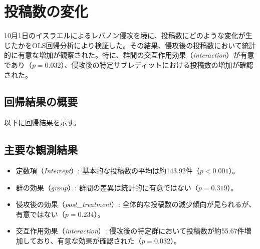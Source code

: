 \documentclass[11pt, a4j]{jreport}
\begin{document}
    \section{投稿数の変化}
    10月1日のイスラエルによるレバノン侵攻を境に、投稿数にどのような変化が生じたかをOLS回帰分析により検証した。その結果、侵攻後の投稿数において統計的に有意な増加が観察された。特に、群間の交互作用効果（\textit{interaction}）が有意であり（$p = 0.032$）、侵攻後の特定サブレディットにおける投稿数の増加が確認された。

    \subsection*{回帰結果の概要}
    以下に回帰結果を示す。

    \begin{table}[H]
        \centering
        \caption{投稿数の変化に関するOLS回帰結果}
        \label{tab:ols_results}
    \end{table}

    \subsection*{主要な観測結果}
    \begin{itemize}
        \item 定数項（\textit{Intercept}）: 基本的な投稿数の平均は約143.92件（$p < 0.001$）。
        \item 群の効果（\textit{group}）: 群間の差異は統計的に有意ではない（$p = 0.319$）。
        \item 侵攻後の効果（\textit{post\_treatment}）: 全体的な投稿数の減少傾向が見られるが、有意ではない（$p = 0.234$）。
        \item 交互作用効果（\textit{interaction}）: 侵攻後の特定群において投稿数が約55.67件増加しており、有意な効果が確認された（$p = 0.032$）。
    \end{itemize}
\end{document}
